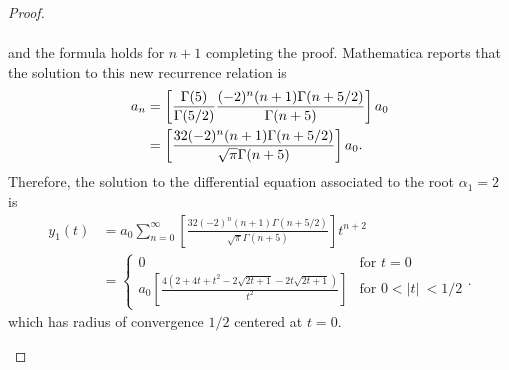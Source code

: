 \documentclass[12pt]{article}
\theoremstyle{definition}
\begin{document}
\begin{proof}
\begin{enumerate}
\begin{align*}
      \end{align*}
      and the formula holds for $n+1$ completing the proof. Mathematica reports that
      the solution to this new recurrence relation is
      \begin{align*}
        a_n &= \left[\frac{\Gamma(5)}{\Gamma(5/2)}\frac{(-2)^{n}(n+1)\Gamma(n+5/2)}{\Gamma(n+5)}\right]a_0 \notag \\
        &= \left[\frac{32(-2)^{n}(n+1)\Gamma(n+5/2)}{\sqrt{\pi}\Gamma(n+5)}\right]a_0.
      \end{align*}
      Therefore, the solution to the differential equation associated to the root $\alpha_1=2$ is
      \begin{align*}
        y_1(t) &= a_0 \sum_{n=0}^\infty \left[\frac{32(-2)^{n}(n+1)\Gamma(n+5/2)}{\sqrt{\pi}\Gamma(n+5)}\right]t^{n+2} \\
        &= \begin{cases}
          0 & \text{for $t=0$}\\
          a_0\left[\frac{4\left(2+4t+t^2-2\sqrt{2t+1}-2t\sqrt{2t+1}\right)}{t^2}\right] & \text{for $0 < |t|\ < 1/2$}
          \end{cases}.
      \end{align*}
      which has radius of convergence $1/2$ centered at $t=0$.


\end{enumerate}
\end{proof}
\end{document}
